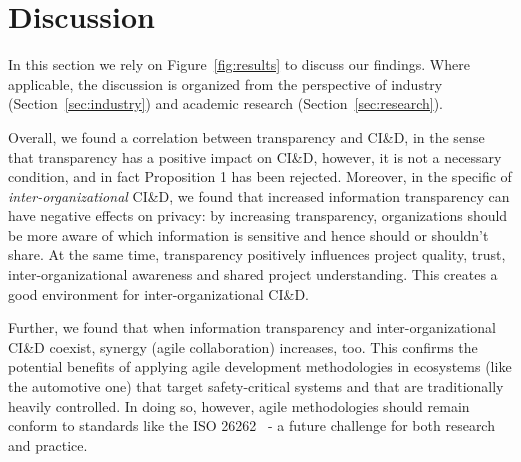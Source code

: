 \section{Discussion}\label{sec:discussion}

In this section we rely on Figure~\ref{fig:results} to discuss our findings. Where applicable, the discussion is organized from the perspective of industry (Section~\ref{sec:industry}) and academic research (Section~\ref{sec:research}).

Overall, we found a correlation between transparency and CI\&D, in the sense that transparency has a positive impact on  CI\&D, however, it is not a necessary condition, and in fact Proposition 1 has been  rejected. 
Moreover, in the specific of {\em inter-organizational} CI\&D, we found that increased information transparency %
can have negative effects on privacy: by increasing transparency, organizations should be more aware of which information is sensitive and hence should or shouldn't share.
At the same time, transparency  positively influences project quality, trust, inter-organizational awareness and shared project understanding. This creates a good environment for inter-organizational CI\&D.

Further, we found that when information transparency and inter-organizational CI\&D coexist, synergy (agile collaboration) increases, too. This confirms the potential benefits of applying agile development methodologies in ecosystems (like the automotive one) that target safety-critical systems and that are traditionally heavily controlled. In doing so, however, agile methodologies should remain conform to standards like the ISO 26262~\cite{iso26262} - a future challenge for both research and practice.

